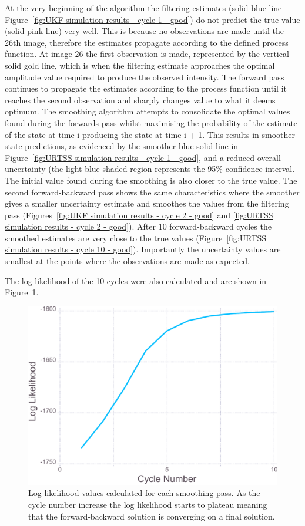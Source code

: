 At the very beginning of the algorithm the filtering estimates (solid blue line Figure~\ref{fig:UKF simulation results - cycle 1 - good}) do not predict the true value (solid pink line) very well.
This is because no observations are made until the 26th image, therefore the estimates propagate according to the defined process function.
At image 26 the first observation is made, represented by the vertical solid gold line, which is when the filtering estimate approaches the optimal amplitude value required to produce the observed intensity.
The forward pass continues to propagate the estimates according to the process function until it reaches the second observation and sharply changes value to what it deems optimum.
The smoothing algorithm attempts to consolidate the optimal values found during the forwards pass whilst maximising the probability of the estimate of the state at time i producing the state at time i + 1.
This results in smoother state predictions, as evidenced by the smoother blue solid line in Figure~\ref{fig:URTSS simulation results - cycle 1 - good}, and a reduced overall uncertainty (the light blue shaded region represents the 95\% confidence interval.
The initial value found during the smoothing is also closer to the true value.
The second forward-backward pass shows the same characteristics where the smoother gives a smaller uncertainty estimate and smoothes the values from the filtering pass (Figures~\ref{fig:UKF simulation results - cycle 2 - good} and \ref{fig:URTSS simulation results - cycle 2 - good}).
After 10 forward-backward cycles the smoothed estimates are very close to the true values (Figure~\ref{fig:URTSS simulation results - cycle 10 - good}).
Importantly the uncertainty values are smallest at the points where the observations are made as expected.

The log likelihood of the 10 cycles were also calculated and are shown in Figure~\ref{fig:Simulation Log likelihood - good}.
\begin{figure}[ht!]
    \centering
    \includegraphics[width=1.0\textwidth]{figures/datared/loglik.pdf}
    \caption{Log likelihood values calculated for each smoothing pass.
    As the cycle number increase the log likelihood starts to plateau meaning that the forward-backward solution is converging on a final solution.}
    \label{fig:Simulation Log likelihood - good}
\end{figure}

